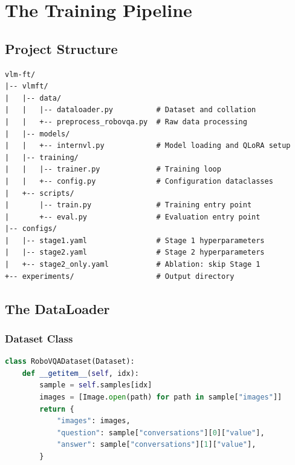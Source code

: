 \documentclass[11pt,a4paper]{article}
\begin{document}
\section{The Training Pipeline}

\subsection{Project Structure}

\begin{lstlisting}[caption=Repository structure]
vlm-ft/
|-- vlmft/
|   |-- data/
|   |   |-- dataloader.py          # Dataset and collation
|   |   +-- preprocess_robovqa.py  # Raw data processing
|   |-- models/
|   |   +-- internvl.py            # Model loading and QLoRA setup
|   |-- training/
|   |   |-- trainer.py             # Training loop
|   |   +-- config.py              # Configuration dataclasses
|   +-- scripts/
|       |-- train.py               # Training entry point
|       +-- eval.py                # Evaluation entry point
|-- configs/
|   |-- stage1.yaml                # Stage 1 hyperparameters
|   |-- stage2.yaml                # Stage 2 hyperparameters
|   +-- stage2_only.yaml           # Ablation: skip Stage 1
+-- experiments/                   # Output directory
\end{lstlisting}

\subsection{The DataLoader}

\subsubsection{Dataset Class}
\begin{lstlisting}[language=Python,caption=Dataset implementation]
class RoboVQADataset(Dataset):
    def __getitem__(self, idx):
        sample = self.samples[idx]
        images = [Image.open(path) for path in sample["images"]]
        return {
            "images": images,
            "question": sample["conversations"][0]["value"],
            "answer": sample["conversations"][1]["value"],
        }
\end{lstlisting}
\end{document}
